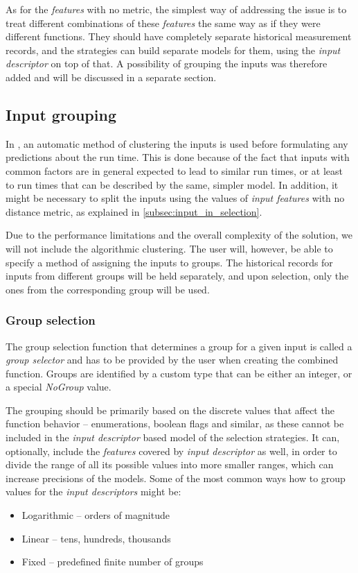 As for the \textit{features} with no metric, the simplest way of addressing the issue is to treat different combinations of these \textit{features} the same way as if they were different functions. They should have completely separate historical measurement records, and the strategies can build separate models for them, using the \textit{input descriptor} on top of that. A possibility of grouping the inputs was therefore added and will be discussed in a separate section.

\subsection{Input grouping}
\label{subsec:grouping}

In \cite{smith_predicting_1998}, an automatic method of clustering the inputs is used before formulating any predictions about the run time. This is done because of the fact that inputs with common factors are in general expected to lead to similar run times, or at least to run times that can be described by the same, simpler model. In addition, it might be necessary to split the inputs using the values of \textit{input features} with no distance metric, as explained in \ref{subsec:input_in_selection}.

Due to the performance limitations and the overall complexity of the solution, we will not include the algorithmic clustering. The user will, however, be able to specify a method of assigning the inputs to groups. The historical records for inputs from different groups will be held separately, and upon selection, only the ones from the corresponding group will be used.

\subsubsection{Group selection}
\label{subsubsec:group_selection}

The group selection function that determines a group for a given input is called a \textit{group selector} and has to be provided by the user when creating the combined function. Groups are identified by a custom type that can be either an integer, or a special \textit{NoGroup} value. 

The grouping should be primarily based on the discrete values that affect the function behavior -- enumerations, boolean flags and similar, as these cannot be included in the \textit{input descriptor} based model of the selection strategies. It can, optionally, include the \textit{features} covered by \textit{input descriptor} as well, in order to divide the range of all its possible values into more smaller ranges, which can increase precisions of the models. Some of the most common ways how to group values for the \textit{input descriptors} might be:
\begin{itemize}
	\item Logarithmic -- orders of magnitude
	\item Linear -- tens, hundreds, thousands
	\item Fixed -- predefined finite number of groups
\end{itemize}

